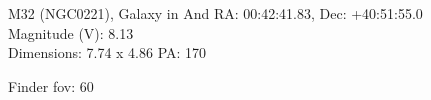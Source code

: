 \begin{block}{M32 (NGC0221), Galaxy in And}
    RA: 00:42:41.83, Dec: +40:51:55.0 \\ 
    Magnitude (V): 8.13 \\ 
    Dimensions: 7.74 x 4.86 PA: 170 

    Finder fov: 60 
\end{block}